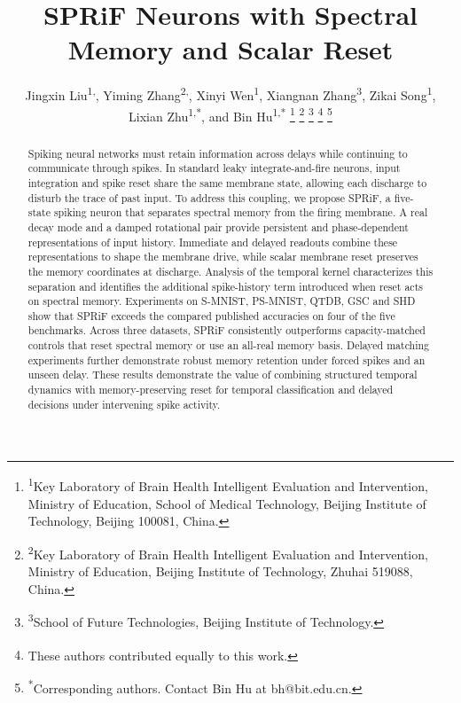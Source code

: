 \documentclass[letterpaper,journal]{IEEEtran}
\begin{document}
\title{SPRiF Neurons with Spectral Memory and Scalar Reset}
\author{Jingxin Liu\textsuperscript{1,\textdagger},
Yiming Zhang\textsuperscript{2,\textdagger},
Xinyi Wen\textsuperscript{1},
Xiangnan Zhang\textsuperscript{3},
Zikai Song\textsuperscript{1},
Lixian Zhu\textsuperscript{1,*},
and Bin Hu\textsuperscript{1,*}
\thanks{\textsuperscript{1}Key Laboratory of Brain Health Intelligent Evaluation and Intervention, Ministry of Education, School of Medical Technology, Beijing Institute of Technology, Beijing 100081, China.}
\thanks{\textsuperscript{2}Key Laboratory of Brain Health Intelligent Evaluation and Intervention, Ministry of Education, Beijing Institute of Technology, Zhuhai 519088, China.}
\thanks{\textsuperscript{3}School of Future Technologies, Beijing Institute of Technology.}
\thanks{\textsuperscript{\textdagger}These authors contributed equally to this work.}
\thanks{\textsuperscript{*}Corresponding authors. Contact Bin Hu at bh@bit.edu.cn.}}
\maketitle


\begin{abstract}
Spiking neural networks must retain information across delays while continuing to communicate through spikes. In standard leaky integrate-and-fire neurons, input integration and spike reset share the same membrane state, allowing each discharge to disturb the trace of past input. To address this coupling, we propose SPRiF, a five-state spiking neuron that separates spectral memory from the firing membrane. A real decay mode and a damped rotational pair provide persistent and phase-dependent representations of input history. Immediate and delayed readouts combine these representations to shape the membrane drive, while scalar membrane reset preserves the memory coordinates at discharge. Analysis of the temporal kernel characterizes this separation and identifies the additional spike-history term introduced when reset acts on spectral memory. Experiments on S-MNIST, PS-MNIST, QTDB, GSC and SHD show that SPRiF exceeds the compared published accuracies on four of the five benchmarks. Across three datasets, SPRiF consistently outperforms capacity-matched controls that reset spectral memory or use an all-real memory basis. Delayed matching experiments further demonstrate robust memory retention under forced spikes and an unseen delay. These results demonstrate the value of combining structured temporal dynamics with memory-preserving reset for temporal classification and delayed decisions under intervening spike activity.
\end{abstract}
\end{document}
